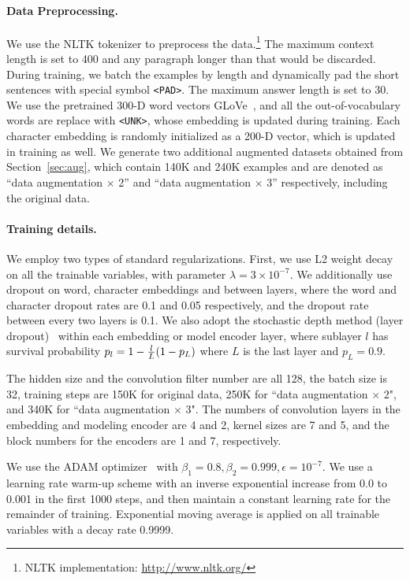 \documentclass{article} \usepackage{iclr2018_conference,times}
\begin{document}
\paragraph{Data Preprocessing.}
We use the NLTK tokenizer to preprocess the data.\footnote{NLTK implementation: \url{http://www.nltk.org/}} The maximum context length is set to 400 and any paragraph longer than that would be discarded. During training, we batch the examples by length and dynamically pad the short sentences with special symbol \texttt{<PAD>}. The maximum answer length is set to 30.
We use the pretrained 300-D word vectors GLoVe~\citep{pennington2014glove}, and all the out-of-vocabulary words are replace with \texttt{<UNK>}, whose embedding is updated during training. Each character embedding is randomly initialized as a 200-D vector, which is updated in training as well.
We generate two additional augmented datasets obtained from Section~\ref{sec:aug}, which contain 140K and 240K examples and are denoted as ``data augmentation $\times$ 2'' and ``data augmentation $\times$ 3'' respectively, including the original data.
 

\paragraph{Training details.}
We employ two types of standard regularizations. First, we use L2 weight decay on all the trainable variables, with parameter $\lambda=3\times 10^{-7}$. We additionally use dropout on word, character embeddings and between layers, where the word and character dropout rates are 0.1 and 0.05 respectively, and the dropout rate between every two layers is 0.1. We also adopt the stochastic depth method (layer dropout)~\citep{HuangSLSW16} within each embedding or model encoder layer, where sublayer $l$ has survival probability
$p_l= 1 - {l\over L} (1-p_L)$ where $L$ is the last layer and $p_L=0.9$. 

The hidden size and the convolution filter number are all 128, the batch size is 32, training steps are 150K for original data, 250K for ``data augmentation $\times$ 2", and 340K for ``data augmentation $\times$ 3". The numbers of convolution layers in the embedding and modeling encoder are 4 and 2, kernel sizes are 7 and 5, and the block numbers for the encoders are 1 and 7, respectively.


We use the ADAM optimizer~\citep{KingmaB14} with $\beta_1=0.8, \beta_2=0.999,\epsilon=10^{-7}$. We use a learning rate warm-up scheme with an inverse exponential increase from 0.0 to 0.001 in the first 1000 steps, and then maintain a constant learning rate for the remainder of training.
Exponential moving average is applied on all trainable variables with a decay rate 0.9999.
\end{document}

